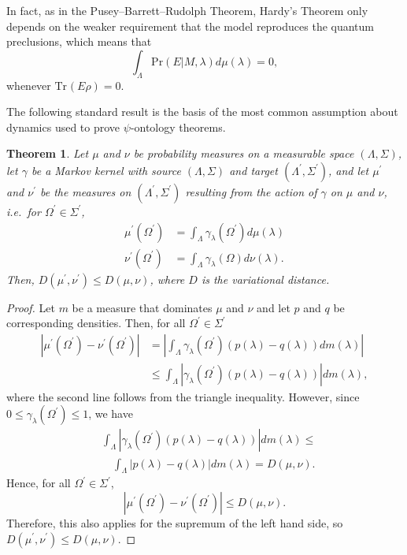 \documentclass[DIV=calc,fontsize=12pt]{scrartcl} %
\theoremstyle{definition}
\theoremstyle{plain}
\newtheorem{theorem}[definition]{Theorem}
\newcommand{\Tr}[2][]{\ensuremath{\text{Tr}_{#1} \left ( #2 \right )}}
\begin{document}
In fact, as in the Pusey--Barrett--Rudolph Theorem, Hardy's Theorem only depends on the
weaker requirement that the model reproduces the quantum preclusions,
which means that
\begin{equation}
\int_{\Lambda} \text{Pr}(E|M,\lambda) d \mu(\lambda) = 0,
\end{equation}
whenever $\Tr{E \rho} = 0$.

The following standard result is the basis of the most common
assumption about dynamics used to prove $\psi$-ontology theorems.
\begin{theorem}
\label{prop:Dyn:contract}
Let $\mu$ and $\nu$ be probability measures on a measurable space
$(\Lambda,\Sigma)$, let $\gamma$ be a Markov kernel with source
$(\Lambda,\Sigma)$ and target $(\Lambda^{\prime},\Sigma^{\prime})$,
and let $\mu^{\prime}$ and $\nu^{\prime}$ be the measures on
$(\Lambda^{\prime},\Sigma^{\prime})$ resulting from the action of
$\gamma$ on $\mu$ and $\nu$, i.e.\ for $\Omega^{\prime} \in
\Sigma^{\prime}$,
\begin{align}
\mu^{\prime}(\Omega^{\prime}) & = \int_{\Lambda}
\gamma_{\lambda}(\Omega^{\prime})d\mu(\lambda) \\
\nu^{\prime}(\Omega^{\prime}) & = \int_{\Lambda}
\gamma_{\lambda}(\Omega) d\nu(\lambda).
\end{align}
Then, $D(\mu^{\prime},\nu^{\prime}) \leq D(\mu,\nu)$, where $D$ is
the variational distance.
\end{theorem}
\begin{proof}
Let $m$ be a measure that dominates $\mu$ and $\nu$ and let $p$ and
$q$ be corresponding densities.  Then, for all $\Omega^{\prime} \in
\Sigma^{\prime}$
\begin{align}
\left | \mu^{\prime}(\Omega^{\prime}) -
\nu^{\prime}(\Omega^{\prime}) \right | & =  \left |
\int_{\Lambda} \gamma_{\lambda}(\Omega^{\prime}) \left (
p(\lambda) - q (\lambda) \right )
dm(\lambda) \right | \\
& \leq \int_{\Lambda} \left | \gamma_{\lambda}(\Omega^{\prime})
\left ( p(\lambda) - q (\lambda) \right ) \right |dm(\lambda),
\end{align}
where the second line follows from the triangle inequality.
However, since $0 \leq \gamma_{\lambda}(\Omega^{\prime}) \leq 1$, we
have
\begin{align}
&\int_{\Lambda} \left | \gamma_{\lambda}(\Omega^{\prime}) \left (
p(\lambda) - q (\lambda) \right ) \right |dm(\lambda) \leq\nonumber\\
&\quad \int_{\Lambda} \left | p(\lambda) - q(\lambda) \right |
dm(\lambda) = D(\mu,\nu).
\end{align}
Hence, for all $\Omega^{\prime} \in \Sigma^{\prime}$,
\begin{equation}
\left | \mu^{\prime}(\Omega^{\prime}) -
\nu^{\prime}(\Omega^{\prime}) \right | \leq D(\mu,\nu).
\end{equation}
Therefore, this also applies for the supremum of the left hand side,
so $D(\mu^{\prime},\nu^{\prime}) \leq D(\mu,\nu)$.
\end{proof}
\end{document}
